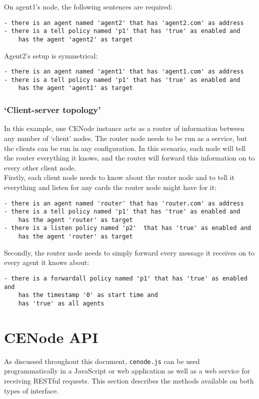 \documentclass{article}
\begin{document}
On agent1's node, the following sentences are required:\\
\begin{verbatim}
- there is an agent named 'agent2' that has 'agent2.com' as address
- there is a tell policy named 'p1' that has 'true' as enabled and 
    has the agent 'agent2' as target
\end{verbatim}

Agent2's setup is symmetrical:\\
\begin{verbatim}
- there is an agent named 'agent1' that has 'agent1.com' as address
- there is a tell policy named 'p1' that has 'true' as enabled and 
    has the agent 'agent1' as target
\end{verbatim}


\subsubsection{`Client-server topology'}
In this example, one CENode instance acts as a router of information between any number of `client' nodes. The router node needs to be run as a service, but the clients can be run in any configuration. In this scenario, each node will tell the router everything it knows, and the router will forward this information on to every other client node.\\

Firstly, each client node needs to know about the router node and to tell it everything and listen for any cards the router node might have for it:\\
\begin{verbatim}
- there is an agent named 'router' that has 'router.com' as address
- there is a tell policy named 'p1' that has 'true' as enabled and 
    has the agent 'router' as target
- there is a listen policy named 'p2'  that has 'true' as enabled and
    has the agent 'router' as target
\end{verbatim}

Secondly, the router node needs to simply forward every message it receives on to every agent it knows about:\\
\begin{verbatim}
- there is a forwardall policy named 'p1' that has 'true' as enabled and
    has the timestamp '0' as start time and 
    has 'true' as all agents
\end{verbatim}


\section{CENode API}
As discussed throughout this document, \texttt{cenode.js} can be used programmatically in a JavaScript or web application as well as a web service for receiving RESTful requests. This section describes the methods available on both types of interface.
\end{document}
